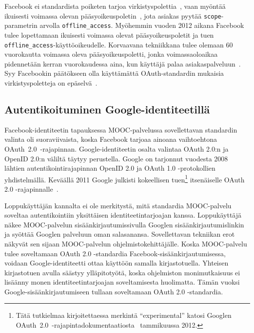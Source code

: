 \documentclass[finnish,gradu]{tktltiki}
\begin{document}
  Facebook ei standardista poiketen tarjoa virkistyspolettia~\cite{bradley_facebook_refresh_tokens_2012}, vaan myöntää ikuisesti voimassa olevan pääsyoikeuspoletin~\cite{facebook_oauth2_doc}, jota asiakas pyytää \verb!scope!-parametrin arvolla \verb!offline_access!. Myöhemmin vuoden 2012 aikana Facebook tulee lopettamaan ikuisesti voimassa olevat pääsyoikeuspoletit ja tuen \verb!offline_access!-käyttöoikeudelle. Korvaavana tekniikkana tulee olemaan 60 vuorokautta voimassa oleva pääsyoikeuspoletti, jonka voimassaoloaikaa pidennetään kerran vuorokaudessa aina, kun käyttäjä palaa asiakaspalveluun~\cite{facebook_oauth2_deprecate_offline, facebook_oauth2_deprecate_offline_mailinglist}. Syy Facebookin päätökseen olla käyttämättä OAuth-standardin mukaisia virkistyspoletteja on epäselvä~\cite{sakimura_facebook_refresh_tokens_2012}.




  \subsection{Autentikoituminen Google-identiteetillä} %
  \label{sub:mooc_google_auth}

  Facebook-identiteetin tapauksessa MOOC-palvelussa sovellettavan standardin valinta oli suoraviivaista, koska Facebook tarjoaa ainoana vaihtoehtona \mbox{OAuth 2.0 -ra}\-ja\-pinnan. Google-identiteetin osalta valintaa OAuth 2.0:n ja OpenID 2.0:n väliltä täytyy perustella.
  Google on tarjonnut vuodesta 2008 lähtien autentikointirajapinnan OpenID 2.0 ja OAuth 1.0 -protokollien yhdistelmällä. Keväällä 2011 Google julkisti kokeellisen tuen\footnote{
  Tätä tutkielmaa kirjoitettaessa merkintä ``experimental'' katosi Googlen \mbox{OAuth 2.0 -ra}\-japintadokumentaatiosta~\cite{google_oauth2_doc} tammikuussa 2012.
  } itsenäiselle OAuth 2.0 -rajapinnalle~\cite{google_oauth2_announcement_2011}.

  Loppukäyttäjän kannalta ei ole merkitystä, mitä standardia MOOC-palvelu soveltaa autentikointiin yksittäisen identiteetintarjoajan kanssa. Loppukäyttäjä näkee MOOC-palvelun sisäänkirjautumissivulla Googlen sisäänkirjautumislinkin ja syöttää Googlen palveluun oman salasanansa. Sovellettavan tekniikan erot näkyvät sen sijaan MOOC-palvelun ohjelmistokehittäjälle. Koska MOOC-palvelu tulee soveltamaan OAuth 2.0 -standardia Facebook-sisäänkirjautumisessa, voidaan Google-identiteetti ottaa käyttöön samalla kirjastotuella. Yhteisen kirjastotuen avulla säästyy ylläpitotyötä, koska ohjelmiston monimutkaisuus ei lisäänny monen identiteetintarjoajan soveltamisesta huolimatta. Tämän vuoksi Google-sisäänkirjautumiseen tullaan soveltamaan OAuth 2.0 -standardia.
\end{document}
